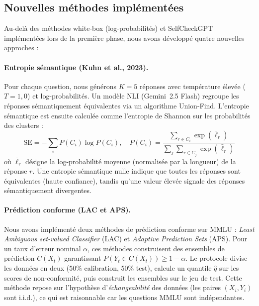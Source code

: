 \documentclass[a4paper, 11pt]{article}
\begin{document}
\subsection{Nouvelles méthodes implémentées}
Au-delà des méthodes white-box (log-probabilités) et SelfCheckGPT implémentées lors de la première phase, nous avons développé quatre nouvelles approches :
\paragraph{Entropie sémantique (Kuhn et al., 2023).}
Pour chaque question, nous générons $K=5$ réponses avec température élevée ($T=1{,}0$) et log-probabilités. Un modèle NLI (Gemini~2.5 Flash) regroupe les réponses sémantiquement équivalentes via un algorithme Union-Find. L'entropie sémantique est ensuite calculée comme l'entropie de Shannon sur les probabilités des clusters :
\begin{equation}
    \text{SE} = -\sum_{i} P(C_i) \log P(C_i), \quad P(C_i) = \frac{\sum_{r \in C_i} \exp(\bar{\ell}_r)}{\sum_{j} \sum_{r \in C_{j}} \exp(\bar{\ell}_r)}
\end{equation}
où $\bar{\ell}_r$ désigne la log-probabilité moyenne (normalisée par la longueur) de la réponse $r$. Une entropie sémantique nulle indique que toutes les réponses sont équivalentes (haute confiance), tandis qu'une valeur élevée signale des réponses sémantiquement divergentes.
\paragraph{Prédiction conforme (LAC et APS).}
Nous avons implémenté deux méthodes de prédiction conforme sur MMLU : \emph{Least Ambiguous set-valued Classifier} (LAC) et \emph{Adaptive Prediction Sets} (APS). Pour un taux d'erreur nominal $\alpha$, ces méthodes construisent des ensembles de prédiction $C(X_t)$ garantissant $P(Y_t \in C(X_t)) \geq 1-\alpha$. Le protocole divise les données en deux (50\% calibration, 50\% test), calcule un quantile $\hat{q}$ sur les scores de non-conformité, puis construit les ensembles sur le jeu de test. Cette méthode repose sur l'hypothèse d'\emph{échangeabilité} des données (les paires $(X_i, Y_i)$ sont i.i.d.), ce qui est raisonnable car les questions MMLU sont indépendantes.
\end{document}
